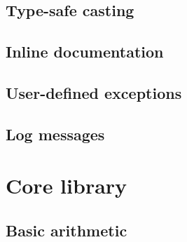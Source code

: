 \documentclass{article}
\theoremstyle{definition}
\begin{document}
\hypertarget{hsec:casting}{}
\subsection{Type-safe casting}
\label{sec:casting}


\hypertarget{hsec:inline-doc}{}
\subsection{Inline documentation}
\label{sec:inline-doc}


\hypertarget{hsec:exception-form}{}
\subsection{User-defined exceptions}
\label{sec:exception-form}


\hypertarget{hsec:logs}{}
\subsection{Log messages}
\label{sec:logs}


\pagebreak

\section{Core library}

\subsection{Basic arithmetic}
\end{document}
